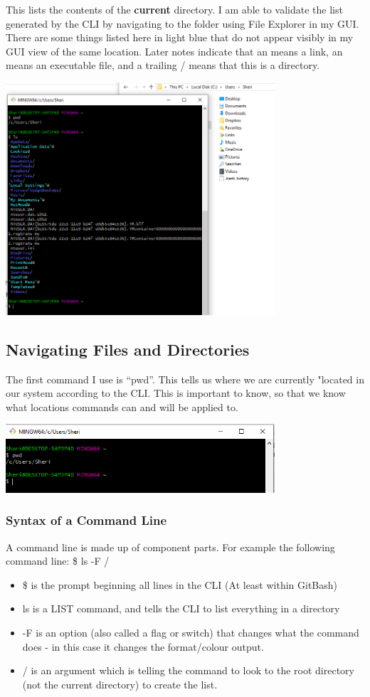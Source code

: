 \documentclass{article}
\begin{document}
This lists the contents of the \textbf{current} directory.
I am able to validate the list generated by the CLI by navigating to the folder using File Explorer in my GUI.
There are some things listed here in light blue that do not appear visibly in my GUI view of the same location.
Later notes indicate that an \@ means a link, an \* means an executable file, and a trailing / means that this is a directory.

\includegraphics[width=10cm]{Images/GitBash_004.PNG}


\subsection{Navigating Files and Directories}

The first command I use is ``pwd''.
This tells us where we are currently "located in our system according to the CLI. This is important to know, so that we know what locations commands can and will be applied to.

\includegraphics[width=10cm]{Images/GitBash_003.PNG}

\subsubsection{Syntax of a Command Line}
A command line is made up of component parts. For example the following command line: \$ ls -F /

\begin{itemize}
    \item \$ is the prompt beginning all lines in the CLI (At least within GitBash)
    \item ls is a LIST command, and tells the CLI to list everything in a directory
    \item -F is an option (also called a flag or switch) that changes what the command does - in this case it changes the format/colour output.
    \item / is an argument which is telling the command to look to the root directory (not the current directory) to create the list.
\end{itemize}
\end{document}
